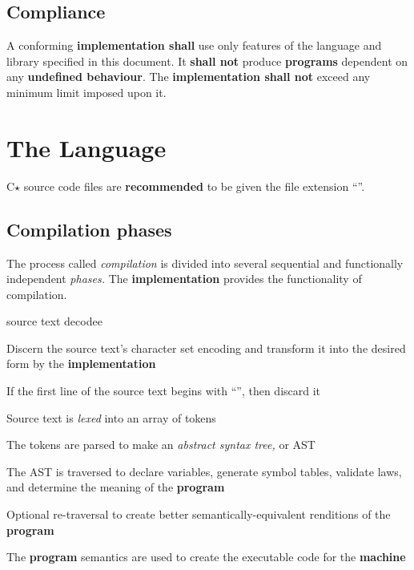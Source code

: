 \documentclass[12pt,english]{article}
\renewcommand{\texttt}[1]{\ttfamily{\small{#1}}\normalfont{}}
\begin{document}
\subsection{Compliance}
\label{s-introduction-compliance}

A conforming \textbf{implementation shall} use only features of the language and library specified in this document. It \textbf{shall not} produce \textbf{programs} dependent on any \textbf{undefined behaviour}. The
\textbf{implementation shall not} exceed any minimum limit imposed upon it.

\section{The Language}
\label{s-language}

C$\star$ source code files are \textbf{recommended} to be given the file
extension ``\texttt{.cst}''.

\subsection{Compilation phases}
\label{s-language-compilation_phases}

The process called \textit{compilation} is divided into several sequential
and functionally independent \textit{phases.} The \textbf{implementation}
provides the functionality of compilation.

\begin{labeling}{source text decodee}
\item [\textbf{Source text decode}] Discern the source text's character set
encoding and transform it into the desired form by the \textbf{implementation}
\item [\textbf{Shebang}] If the first line of the source text begins with
``\texttt{\#!}'', then discard it
\item [\textbf{Lexing}] Source text is \textit{lexed} into an array of
tokens
\item [\textbf{Parsing}] The tokens are parsed to make an \textit{abstract
syntax tree,} or AST
\item [\textbf{Semantic analysis}] The AST is traversed to declare variables,
generate symbol tables, validate laws, and determine the meaning of the
\textbf{program}
\item [\textbf{Optimisation}] Optional re-traversal to create better
semantically-equivalent renditions of the \textbf{program}
\item [\textbf{Code generation}] The \textbf{program} semantics are used to
create the executable code for the \textbf{machine}
\end{labeling}
\end{document}
